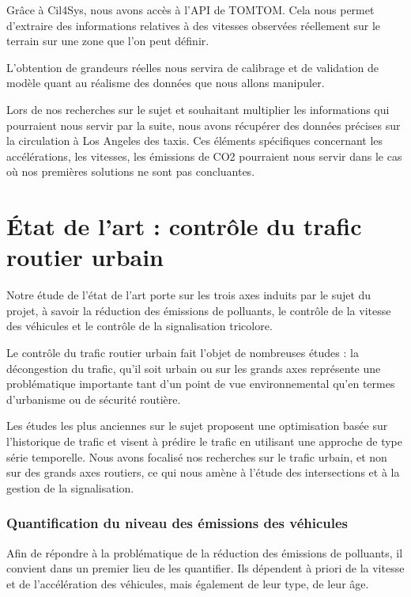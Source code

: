 \documentclass[11pt]{article}
\begin{document}
Grâce à Cil4Sys, nous avons accès à l'API de TOMTOM. Cela nous permet d'extraire des informations relatives à des vitesses observées réellement sur le terrain sur une zone que l'on peut définir.

L'obtention de grandeurs réelles nous servira de calibrage et de validation de modèle quant au réalisme des données que nous allons manipuler.

Lors de nos recherches sur le sujet et souhaitant multiplier les informations qui pourraient nous servir par la suite, nous avons récupérer des données précises sur la circulation à Los Angeles des taxis. Ces éléments spécifiques concernant les accélérations, les vitesses, les émissions de CO2 pourraient nous servir dans le cas où nos premières solutions ne sont pas concluantes.

\section{État de l'art : contrôle du trafic routier urbain}
\label{sec:orgeaf9c55}

Notre étude de l'état de l'art porte sur les trois axes induits par le sujet du projet, à savoir la réduction des émissions de polluants, le contrôle de la vitesse des véhicules et le contrôle de la signalisation tricolore.

Le contrôle du trafic routier urbain fait l'objet de nombreuses études : la décongestion du trafic, qu'il soit urbain ou sur les grands axes représente une problématique importante tant d'un point de vue environnemental qu'en termes d'urbanisme ou de sécurité routière.

Les études les plus anciennes sur le sujet proposent une optimisation basée sur l'historique de trafic et visent à prédire le trafic en utilisant une approche de type série temporelle.
Nous avons focalisé nos recherches sur le trafic urbain, et non sur des grands axes routiers, ce qui nous amène à l'étude des intersections et à la gestion de la signalisation.

\subsubsection{Quantification du niveau des émissions des véhicules}
\label{sec:orgbad8796}

Afin de répondre à la problématique de la réduction des émissions de polluants, il convient dans un premier lieu de les quantifier. Ils dépendent à priori de la vitesse et de l'accélération des véhicules, mais également de leur type, de leur âge. 
\end{document}
